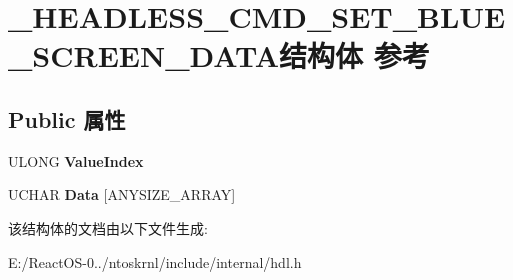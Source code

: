 \hypertarget{struct___h_e_a_d_l_e_s_s___c_m_d___s_e_t___b_l_u_e___s_c_r_e_e_n___d_a_t_a}{}\section{\+\_\+\+H\+E\+A\+D\+L\+E\+S\+S\+\_\+\+C\+M\+D\+\_\+\+S\+E\+T\+\_\+\+B\+L\+U\+E\+\_\+\+S\+C\+R\+E\+E\+N\+\_\+\+D\+A\+T\+A结构体 参考}
\label{struct___h_e_a_d_l_e_s_s___c_m_d___s_e_t___b_l_u_e___s_c_r_e_e_n___d_a_t_a}
\subsection*{Public 属性}
\begin{DoxyCompactItemize}
\item 
\mbox{\label{struct___h_e_a_d_l_e_s_s___c_m_d___s_e_t___b_l_u_e___s_c_r_e_e_n___d_a_t_a_a52ed07f55c838904b700ee897d0faa01}} 
U\+L\+O\+NG {\bfseries Value\+Index}
\item 
\mbox{\label{struct___h_e_a_d_l_e_s_s___c_m_d___s_e_t___b_l_u_e___s_c_r_e_e_n___d_a_t_a_a2aa551eb8853ef451de830e571db2021}} 
U\+C\+H\+AR {\bfseries Data} \mbox{[}A\+N\+Y\+S\+I\+Z\+E\+\_\+\+A\+R\+R\+AY\mbox{]}
\end{DoxyCompactItemize}


该结构体的文档由以下文件生成\+:\begin{DoxyCompactItemize}
\item 
E\+:/\+React\+O\+S-\/0../ntoskrnl/include/internal/hdl.\+h\end{DoxyCompactItemize}
